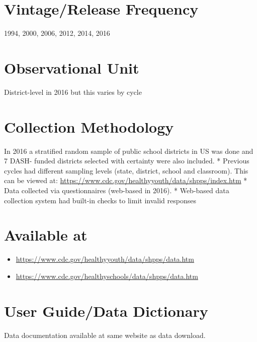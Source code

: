\documentclass[
]{book}
\providecommand{\tightlist}{%
  \setlength{\itemsep}{0pt}\setlength{\parskip}{0pt}}
\begin{document}
\hypertarget{vintagerelease-frequency-75}{%
\section{Vintage/Release Frequency}\label{vintagerelease-frequency-75}}

1994, 2000, 2006, 2012, 2014, 2016

\hypertarget{observational-unit-75}{%
\section{Observational Unit}\label{observational-unit-75}}

District-level in 2016 but this varies by cycle

\hypertarget{collection-methodology-75}{%
\section{Collection Methodology}\label{collection-methodology-75}}

In 2016 a stratified random sample of public school districts in US was done and 7 DASH- funded districts selected with certainty were also included.
* Previous cycles had different sampling levels (state, district, school and classroom). This can be viewed at: \url{https://www.cdc.gov/healthyyouth/data/shpps/index.htm}
* Data collected via questionnaires (web-based in 2016).
* Web-based data collection system had built-in checks to limit invalid responses

\hypertarget{available-at-75}{%
\section{Available at}\label{available-at-75}}

\begin{itemize}
\tightlist
\item
  \url{https://www.cdc.gov/healthyyouth/data/shpps/data.htm}
\item
  \url{https://www.cdc.gov/healthyschools/data/shpps/data.htm}
\end{itemize}

\hypertarget{user-guidedata-dictionary-75}{%
\section{User Guide/Data Dictionary}\label{user-guidedata-dictionary-75}}

Data documentation available at same website as data download.
\end{document}
